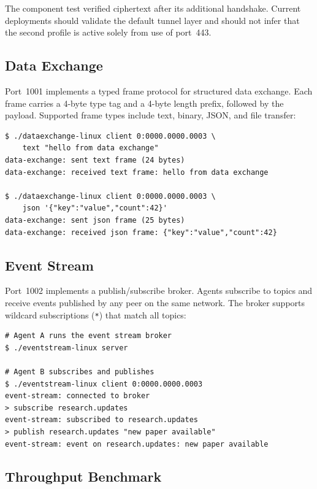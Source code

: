 \documentclass[11pt,a4paper]{article}
\begin{document}
The component test verified ciphertext after its additional handshake. Current deployments should validate the default tunnel layer and should not infer that the second profile is active solely from use of port~443.

\subsection{Data Exchange}

Port~1001 implements a typed frame protocol for structured data exchange. Each frame carries a 4-byte type tag and a 4-byte length prefix, followed by the payload. Supported frame types include text, binary, JSON, and file transfer:

\begin{lstlisting}[basicstyle=\ttfamily\small]
$ ./dataexchange-linux client 0:0000.0000.0003 \
    text "hello from data exchange"
data-exchange: sent text frame (24 bytes)
data-exchange: received text frame: hello from data exchange

$ ./dataexchange-linux client 0:0000.0000.0003 \
    json '{"key":"value","count":42}'
data-exchange: sent json frame (25 bytes)
data-exchange: received json frame: {"key":"value","count":42}
\end{lstlisting}

\subsection{Event Stream}

Port~1002 implements a publish/subscribe broker. Agents subscribe to topics and receive events published by any peer on the same network. The broker supports wildcard subscriptions (\texttt{*}) that match all topics:

\begin{lstlisting}[basicstyle=\ttfamily\small]
# Agent A runs the event stream broker
$ ./eventstream-linux server

# Agent B subscribes and publishes
$ ./eventstream-linux client 0:0000.0000.0003
event-stream: connected to broker
> subscribe research.updates
event-stream: subscribed to research.updates
> publish research.updates "new paper available"
event-stream: event on research.updates: new paper available
\end{lstlisting}

\subsection{Throughput Benchmark}
\end{document}

